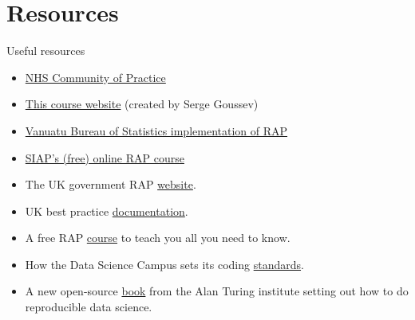 \documentclass[xcolor=x11names,compress, aspectratio=169]{beamer}
\renewcommand{\(}{\begin{columns}}
\renewcommand{\)}{\end{columns}}
\newcommand{\<}[1]{\begin{column}{#1}}
\renewcommand{\>}{\end{column}}
\begin{document}
\section{Resources}
\begin{frame}{Useful resources}
  \begin{itemize}
  \item  \href{https://nhsdigital.github.io/rap-community-of-practice/introduction_to_RAP/what_is_RAP/}{NHS Community of Practice}
   \item  \href{https://github.com/sergegoussev/ESCAP_RAP_class/tree/main}{This course website} (created by Serge Goussev)
   \item \href{https://github.com/Vanuatu-National-Statistics-Office/vnso-RAP-marketStats-materials}{Vanuatu Bureau of Statistics implementation of RAP}
   \item \href{https://www.unsiap.or.jp/on_line/2024/RAP/flyer-RAP-Self-paced.pdf}{SIAP's (free) online RAP course}
    \item The UK government RAP \href{https://ukgovdatascience.github.io/rap-website/index.html}{website}.
    \item UK best practice \href{https://gss.civilservice.gov.uk/policy-store/quality-statistics-in-government/\#reproducible-analytical-pipelines-rap-}{documentation}.
    \item A free RAP \href{https://www.udemy.com/course/reproducible-analytical-pipelines/}{course} to teach you all you need to know.
    \item How the Data Science Campus sets its coding \href{https://datasciencecampus.github.io/coding-standards/}{standards}.
    \item A new open-source \href{https://the-turing-way.netlify.com}{book} from the Alan Turing institute setting out how to do reproducible data science.
  \end{itemize}
\end{frame}
\end{document}
